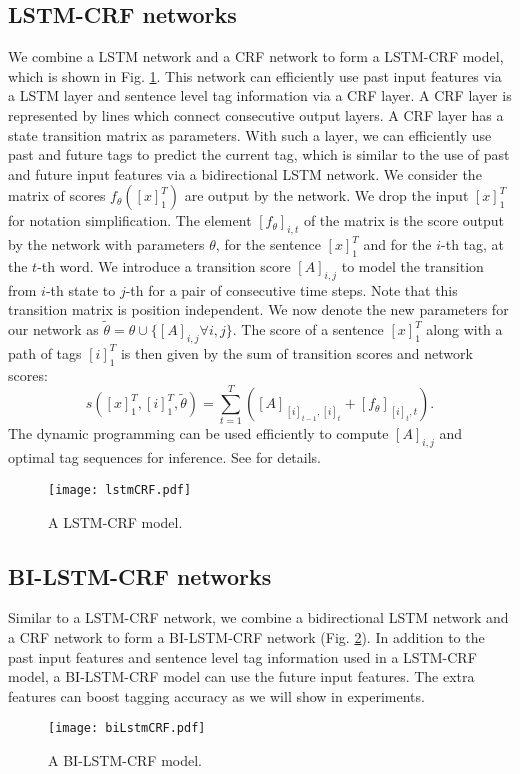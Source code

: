 \documentclass[11pt,a4paper]{article}
\begin{document}
\subsection{LSTM-CRF networks}
We combine a LSTM network and a CRF network to form a LSTM-CRF model, which is shown in Fig. \ref{fig:lstmCRF}. This network can efficiently use past input features via a LSTM layer and sentence level tag information via a CRF layer. A CRF layer is represented by lines which connect consecutive output layers. A CRF layer has a state transition matrix as parameters. With such a layer, we can efficiently use past and future tags to predict the current tag, which is similar to the use of past and future input features via a bidirectional LSTM network.  We consider the matrix of scores $f_\theta([x]_1^T)$ are output by the network. We drop the input $[x]_1^T$ for notation simplification. The element $[f_\theta]_{i,t}$ of the matrix is the score output by the network with parameters $\theta$, for the sentence $[x]_1^T$ and for the $i$-th tag, at the $t$-th word. We introduce a transition score $[A]_{i,j}$ to model the transition from $i$-th state to $j$-th for a pair of consecutive time steps. Note that this transition matrix is position independent.  We now denote the new parameters for our network as $\tilde{\theta} = \theta \cup \{ [A]_{i,j} \forall i, j\}$. The score of a sentence $[x]_1^T$ along with a path of tags $[i]_1^T$ is then given by the sum of transition scores and network scores:
\begin{equation}
s([x]_1^T, [i]_1^T, \tilde{\theta}) = \sum_{t=1}^T ([A]_{[i]_{t-1}, [i]_t} + [f_{\theta}]_{[i]_t, t}).
\label{eq:score}
\end{equation}
The dynamic programming \cite{rabiner1} can be used efficiently to compute $[A]_{i,j}$ and optimal tag sequences for inference. See \cite{lafferty1} for details.
\begin{figure}[!htb]
	\centering
		\texttt{[image: lstmCRF.pdf]}
	\caption{A LSTM-CRF model.}
	\label{fig:lstmCRF}
\end{figure} 

\subsection{BI-LSTM-CRF networks}
Similar to a LSTM-CRF network, we combine a bidirectional LSTM network and a CRF network to form a BI-LSTM-CRF network (Fig. \ref{fig:biLstmCRF}). In addition to the past input features and sentence level tag information used in a LSTM-CRF model, a BI-LSTM-CRF model can use the future input features. The extra features can boost tagging accuracy as we will show in experiments.
\begin{figure}[!htb]
	\centering
		\texttt{[image: biLstmCRF.pdf]}
	\caption{A BI-LSTM-CRF model.}
	\label{fig:biLstmCRF}
\end{figure} 
\end{document}
